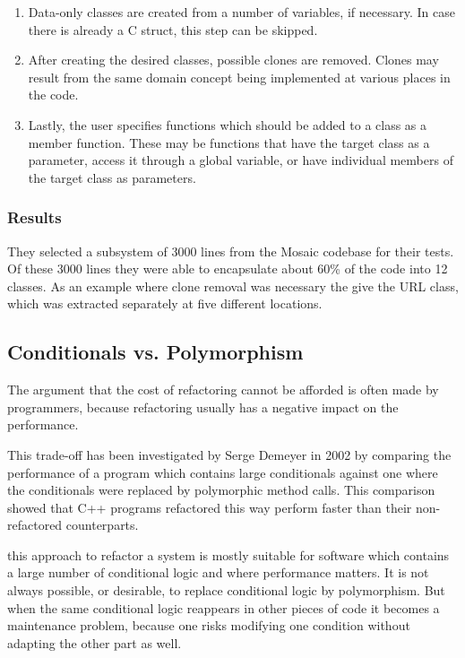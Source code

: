 \documentclass[conference,compsoc,a4paper]{IEEEtran}
\newcommand{\code}[1]{{\small\ttfamily #1}}
\begin{document}
\begin{enumerate}
  \item Data-only classes are created from a number of variables, if necessary. In case there is already a C 
  \code{struct}, this step can be skipped.
  
  \item After creating the desired classes, possible clones are removed. Clones may result from the same domain concept 
  being implemented at various places in the code.
  
  \item Lastly, the user specifies functions which should be added to a class as a member function. These may be 
  functions that have the target class as a parameter, access it through a global variable, or have individual members 
  of the target class as parameters.
\end{enumerate}

\subsubsection{Results}

They selected a subsystem of 3000 lines from the Mosaic codebase for their tests. Of these 3000 lines they were able to 
encapsulate about 60\% of the code into 12 classes. As an example where clone removal was necessary the give the URL 
class, which was extracted separately at five different locations.

\subsection{Conditionals vs. Polymorphism}

The argument that the cost of refactoring cannot be afforded is often made by programmers, because refactoring usually 
has a negative impact on the performance.

This trade-off has been investigated by Serge Demeyer in 2002 \cite{polymorphism} by comparing the performance of a 
program which contains large conditionals against one where the conditionals were replaced by polymorphic method calls. 
This comparison showed that C++ programs refactored this way perform faster than their non-refactored counterparts.

this approach to refactor a system is mostly suitable for software which contains a large number of conditional logic 
and where performance matters. It is not always possible, or desirable, to replace conditional logic by polymorphism. 
But when the same conditional logic reappears in other pieces of code it becomes a maintenance problem, because one 
risks modifying one condition without adapting the other part as well.
\end{document}
